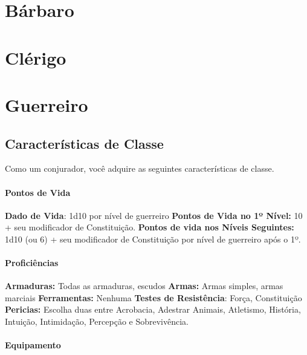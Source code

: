 \documentclass{RPG_Adventure}[2021/10/20]
\begin{document}

\chapter{Bárbaro}%
\label{cha:barbaro}


\chapter{Clérigo}%
\label{cha:clerigo}


\chapter{Guerreiro}%
\label{cha:guerreiro}

\section*{Características de Classe}%

Como um conjurador, você adquire as seguintes características de classe.

\subsubsection{Pontos de Vida}%

\textbf{Dado de Vida}: 1d10 por nível de guerreiro \nl
\textbf{Pontos de Vida no 1º Nível:} 10 + seu modificador de Constituição. \nl
\textbf{Pontos de vida nos Níveis Seguintes:} 1d10 (ou 6) + seu modificador de
Constituição por nível de guerreiro após o 1º.

\subsubsection{Proficiências}%

\textbf{Armaduras:} Todas as armaduras, escudos \nl
\textbf{Armas:} Armas simples, armas marciais \nl
\textbf{Ferramentas:} Nenhuma \jump
\textbf{Testes de Resistência}: Força, Constituição \nl
\textbf{Pericias:} Escolha duas entre Acrobacia, Adestrar Animais, Atletismo,
História, Intuição, Intimidação, Percepção e Sobrevivência.

\subsubsection{Equipamento}%
\end{document}
